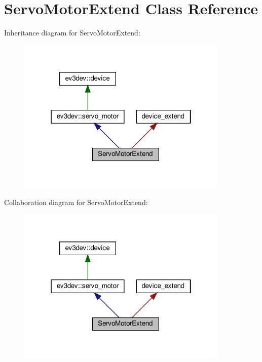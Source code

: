 \hypertarget{classServoMotorExtend}{}\section{Servo\+Motor\+Extend Class Reference}
\label{classServoMotorExtend}


Inheritance diagram for Servo\+Motor\+Extend\+:
\nopagebreak
\begin{figure}[H]
\begin{center}
\leavevmode
\includegraphics[width=286pt]{classServoMotorExtend__inherit__graph}
\end{center}
\end{figure}


Collaboration diagram for Servo\+Motor\+Extend\+:
\nopagebreak
\begin{figure}[H]
\begin{center}
\leavevmode
\includegraphics[width=286pt]{classServoMotorExtend__coll__graph}
\end{center}
\end{figure}
